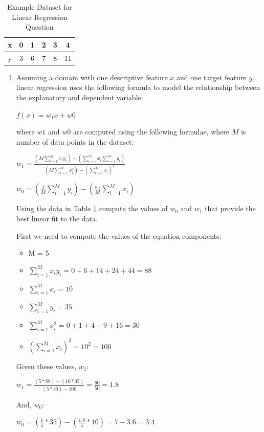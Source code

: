 \documentclass[solution]{ditpaper}
\begin{document}

\begin{table}
\begin{center}
\begin{tabular}{cccccc}
\hline
x & 0 & 1 & 2 & 3 & 4\\
\hline
y & 3 & 6 & 7 & 8 & 11\\
\hline
\end{tabular}
\caption{Example Dataset for Linear Regression Question}
\label{tab:linregTab2}
\end{center}
\end{table}

\question 
	\begin{enumerate}
		\item Assuming a domain with one descriptive feature $x$ and one target feature $y$ linear regression uses the following formula to model the relationship between the explanatory and dependent variable: 
	\begin{center}
		$f(x) = w_1x + w0$
	\end{center}
where $w1$ and $w0$ are computed using the following formulae, where $M$ is number of data points in the dataset:
	\begin{center}
		$w_1 =  \frac{(M \sum_{i=1}^M x_i y_i) - (\sum_{i=1}^{M} x_i \sum_{i=1}^{M} y_i)} {(M \sum_{i=1}^{M} x_i^2) - (\sum_{i=1}^{M} x_i)^2}$
	\end{center}
	\begin{center}
		$w_0 = (\frac{1}{M} \sum_{i=1}^{M} y_i) - (\frac{w_1}{M} \sum_{i=1}^{M} x_i)$
	\end{center}
Using the data in Table \ref{tab:linregTab2} compute the values of $w_0$ and $w_1$ that provide the best linear fit to the data.
			\begin{answer}
				First we need to compute the values of the equation components:
			\begin{itemize}
				\item M = 5
				\item $\sum_{i=1}^{M} x_i y_i = 0 + 6 + 14 + 24 + 44 = 88$
				\item $\sum_{i=1}^{M} x_i = 10$
			   	\item $\sum_{i=1}^{M} y_i = 35$
			  	\item $\sum_{i=1}^{M} x_i^2 = 0 + 1 + 4 + 9 + 16 = 30$
			  	\item $(\sum_{i=1}^{M} x_i)^2 = 10^2 = 100$
			\end{itemize}
				Given these values,  $w_1$:
				\begin{center}
					\textbf{$w_1= \frac{(5*88)-(10*35)}{(5*30)-100} = \frac{90}{50}=1.8$}
				\end{center}
				And, $w_0$:
				\begin{center}
				\textbf{$w_0= (\frac{1}{5}*35) - (\frac{1.8}{5}*10)= 7-3.6=3.4$}
			\end{center}
			\end{answer}
		

\end{enumerate}
\end{document}
